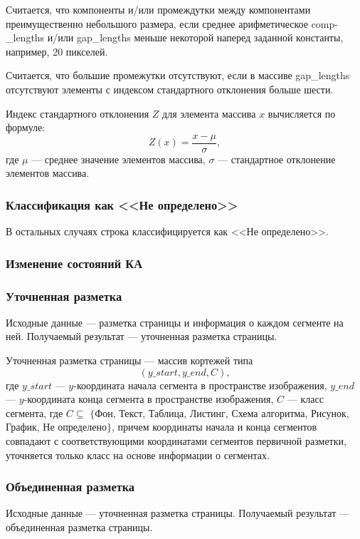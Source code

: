 Считается, что компоненты и/или промеждутки между компонентами преимущественно небольшого размера, если среднее арифметическое comp-\_lengths и/или gap\_lengths меньше некоторой наперед заданной константы, например, 20 пикселей.

Считается, что большие промежутки отсутствуют, если в массиве gap\_lengths отсутствуют элементы с индексом стандартного отклонения больше шести.

Индекс стандартного отклонения $Z$ для элемента массива $x$ вычисляется по формуле:
$$
Z(x) = \frac{x - \mu}{\sigma},
$$
где $\mu$ --- среднее значение элементов массива, $\sigma$ --- стандартное отклонение элементов массива.

\subsubsection*{Классификация как <<Не определено>>}

В остальных случаях строка классифицируется как <<Не определено>>.

\subsubsection*{Изменение состояний КА}

\subsubsection{Уточненная разметка}

Исходные данные --- разметка страницы и информация о каждом сегменте на ней.
Получаемый результат --- уточненная разметка страницы.

Уточненная разметка страницы --- массив кортежей типа
$$
(y\_start, y\_end, C),
$$
где $y\_start$ --- $y$-координата начала сегмента в пространстве изображения, $y\_end$ --- $y$-координата конца сегмента в пространстве изображения, $C$ --- класс сегмента, где $C \subseteq$ $\{$Фон, Текст, Таблица, Листинг, Схема алгоритма, Рисунок, График, Не определено$\}$, причем координаты начала и конца сегментов совпадают с соответствующими координатами сегментов первичной разметки, уточняется только класс на основе информации о сегментах.

\subsubsection{Объединенная разметка}

Исходные данные --- уточненная разметка страницы.
Получаемый результат --- объединенная разметка страницы.

